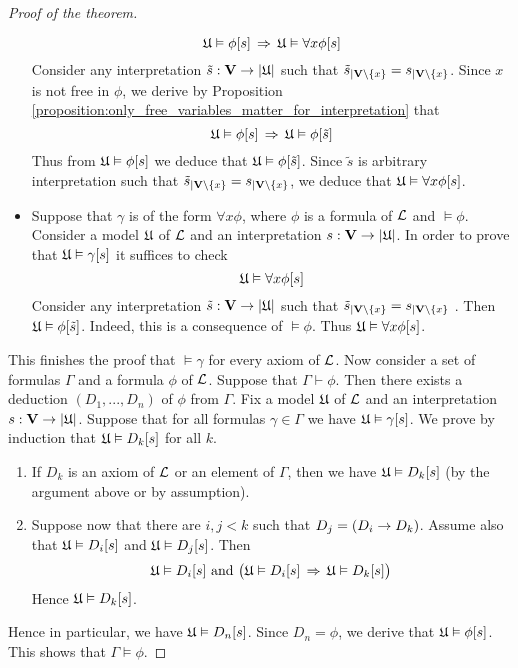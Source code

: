 \documentclass[10pt]{amsart}
\begin{document}
\begin{proof}[Proof of the theorem]
\begin{itemize}
		      $${\mathfrak U} \vDash \phi[s] \,\Rightarrow\, {\mathfrak U} \vDash \forall x\phi[s]$$
		      Consider any interpretation $\tilde{s}:\mathbf{V} \rightarrow |{\mathfrak U}|$ such that $\tilde{s}_{\mid \mathbf{V}\setminus \{x\}} = s_{\mid \mathbf{V}\setminus \{x\}}$. Since $x$ is not free in $\phi$, we derive by Proposition \ref{proposition:only_free_variables_matter_for_interpretation} that
		      $${\mathfrak U} \vDash \phi[s] \,\Rightarrow\, {\mathfrak U} \vDash \phi[\tilde{s}]$$
		      Thus from ${\mathfrak U} \vDash \phi[s]$ we deduce that ${\mathfrak U} \vDash \phi[\tilde{s}]$. Since $\tilde{s}$ is arbitrary interpretation such that $\tilde{s}_{\mid \mathbf{V}\setminus \{x\}} = s_{\mid \mathbf{V}\setminus \{x\}}$, we deduce that ${\mathfrak U} \vDash \forall x\phi[s]$.
		\item Suppose that $\gamma$ is of the form $\forall x\phi$, where $\phi$ is a formula of ${\mathcal L}$ and $\vDash \phi$. Consider a model ${\mathfrak U}$ of ${\mathcal L}$ and an interpretation $s:\mathbf{V} \rightarrow |{\mathfrak U}|$. In order to prove that ${\mathfrak U} \vDash \gamma[s]$ it suffices to check
		      $${\mathfrak U} \vDash \forall x\phi[s]$$
		      Consider any interpretation $\tilde{s}:\mathbf{V} \rightarrow |{\mathfrak U}|$ such that $\tilde{s}_{\mid \mathbf{V}\setminus \{x\}} = s_{\mid \mathbf{V}\setminus \{x\}}$ . Then ${\mathfrak U} \vDash \phi[\tilde{s}]$. Indeed, this is a consequence of $\vDash \phi$. Thus ${\mathfrak U} \vDash \forall  x\phi[s]$.
	\end{itemize}
	This finishes the proof that $\vDash \gamma$ for every axiom of ${\mathcal L}$. Now consider a set of formulas $\Gamma$ and a formula $\phi$ of ${\mathcal L}$. Suppose that $\Gamma \vdash \phi$. Then there exists a deduction $(D_1, ..., D_n)$ of $\phi$ from $\Gamma$. Fix a model ${\mathfrak U}$ of ${\mathcal L}$ and an interpretation $s:\mathbf{V} \rightarrow |{\mathfrak U}|$. Suppose that for all formulas $\gamma \in \Gamma$ we have ${\mathfrak U} \vDash \gamma[s]$. We prove by induction that ${\mathfrak U} \vDash D_k[s]$ for all $k$.
	\begin{enumerate}[label=\textbf{(\arabic*)}, leftmargin=3.0em]
		\item If $D_k$ is an axiom of ${\mathcal L}$ or an element of $\Gamma$, then we have ${\mathfrak U} \vDash D_k[s]$ (by the argument above or
		      by assumption).
		\item Suppose now that there are $i, j < k$ such that $D_j = (D_i \rightarrow D_k)$. Assume also that ${\mathfrak U} \vDash D_i[s]$ and ${\mathfrak U} \vDash D_j[s]$. Then
		      $${\mathfrak U} \vDash D_i[s]\mbox{ and }\big({\mathfrak U} \vDash D_i[s] \,\Rightarrow\, {\mathfrak U} \vDash D_k[s]\big)$$
		      Hence ${\mathfrak U} \vDash D_k[s]$.
	\end{enumerate}
	Hence in particular, we have ${\mathfrak U} \vDash D_n[s]$. Since $D_n = \phi$, we derive that ${\mathfrak U} \vDash \phi[s]$. This shows that $\Gamma \vDash \phi$.
\end{proof}
\end{document}
